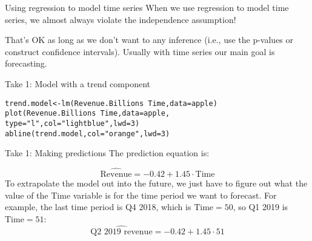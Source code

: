 \documentclass{beamer}\usepackage[]{graphicx}\usepackage[]{color}
\makeatletter
\newcommand{\hlnum}[1]{\textcolor[rgb]{0.824,0.412,0.118}{#1}}%
\newcommand{\hlstr}[1]{\textcolor[rgb]{1,0.894,0.71}{#1}}%
\newcommand{\hlopt}[1]{\textcolor[rgb]{1,0.894,0.769}{#1}}%
\newcommand{\hlstd}[1]{\textcolor[rgb]{1,0.894,0.769}{#1}}%
\newcommand{\hlkwb}[1]{\textcolor[rgb]{0.804,0.776,0.451}{#1}}%
\newcommand{\hlkwc}[1]{\textcolor[rgb]{0.78,0.941,0.545}{#1}}%
\newcommand{\hlkwd}[1]{\textcolor[rgb]{1,0.78,0.769}{#1}}%
\newenvironment{kframe}{%
 \def\at@end@of@kframe{}%
 \ifinner\ifhmode%
  \def\at@end@of@kframe{\end{minipage}}%
  \begin{minipage}{\columnwidth}%
 \fi\fi%
 \def\FrameCommand##1{\hskip\@totalleftmargin \hskip-\fboxsep
 \colorbox{shadecolor}{##1}\hskip-\fboxsep
     \hskip-\linewidth \hskip-\@totalleftmargin \hskip\columnwidth}%
 \MakeFramed {\advance\hsize-\width
   \@totalleftmargin\z@ \linewidth\hsize
   \@setminipage}}%
 {\par\unskip\endMakeFramed%
 \at@end@of@kframe}
\newenvironment{knitrout}{}{} %
\makeatother
\begin{document}
\begin{darkframes}
    \begin{frame}{Using regression to model time series}
      When we use regression to model time series, we almost always violate the independence assumption!

      \bigskip\pause

      That's OK as long as we don't want to any inference (i.e., use the p-values or construct confidence intervals). Usually with time series our main goal is \alert{forecasting}.
    \end{frame}

    \begin{frame}[fragile]{Take 1: Model with a trend component}
      \fontvsm
\begin{knitrout}
\begin{kframe}
\begin{alltt}
\hlstd{trend.model} \hlkwb{<-} \hlkwd{lm}\hlstd{(Revenue.Billions} \hlopt{~} \hlstd{Time,} \hlkwc{data}\hlstd{=apple)}
\hlkwd{plot}\hlstd{(Revenue.Billions} \hlopt{~} \hlstd{Time,} \hlkwc{data}\hlstd{=apple,}
  \hlkwc{type}\hlstd{=}\hlstr{"l"}\hlstd{,} \hlkwc{col}\hlstd{=}\hlstr{"lightblue"}\hlstd{,} \hlkwc{lwd}\hlstd{=}\hlnum{3}\hlstd{)}
\hlkwd{abline}\hlstd{(trend.model,} \hlkwc{col}\hlstd{=}\hlstr{"orange"}\hlstd{,} \hlkwc{lwd}\hlstd{=}\hlnum{3}\hlstd{)}
\end{alltt}
\end{kframe}


\end{knitrout}
    \end{frame}

    \begin{frame}{Take 1: Making predictions}
      The prediction equation is:

      \[
        \widehat{\text{Revenue}} =
          -0.42 +
          1.45 \cdot\text{Time}
      \]
      To extrapolate the model out into the future, we just have to figure out what the value of the Time variable is for the time period we want to  forecast. \pause For example, the last time period is Q4 2018, which is $\text{Time}=50$, so Q1 2019 is $\text{Time}=51$:
      \[
        \widehat{\text{Q2 2019 revenue}} =
          -0.42 +
          1.45 \cdot 51
      \]
    \end{frame}


\end{darkframes}
\end{document}
